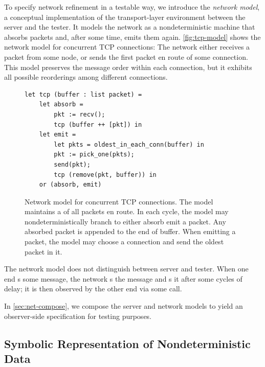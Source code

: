To specify network refinement in a testable way, we introduce
the {\em network model}, a conceptual implementation of the transport-layer
environment between the server and the tester.  It models the network as a
nondeterministic machine that absorbs packets and,  after some time, emits
them again.  \autoref{fig:tcp-model} shows the network model for concurrent TCP
connections: The network
either
receives a packet from some node, or sends the first packet en route of some
connection.  This model preserves the message order within each connection,
but it exhibits all possible reorderings among different connections.

\begin{figure}
\begin{lstlisting}[style=customcoq]
let tcp (buffer : list packet) =
    let absorb =
        pkt := recv();
        tcp (buffer ++ [pkt]) in
    let emit =
        let pkts = oldest_in_each_conn(buffer) in
        pkt := pick_one(pkts);
        send(pkt);
        tcp (remove(pkt, buffer)) in
    or (absorb, emit)
\end{lstlisting}
\caption{Network model for concurrent TCP connections.  The model maintains a
   of all packets en
  route.  In each cycle, the model may nondeterministically branch to either
  absorb  emit a packet.  Any absorbed packet is appended to the end of
  buffer.  When emitting a packet, the model may choose a connection and send
  the oldest packet in it.
}
\label{fig:tcp-model}
\end{figure}

The network model does not distinguish between server and tester.  When one end
s some message, the network s the message and s it
after some cycles of delay; it is then observed by the other end via some
 call.

In \autoref{sec:net-compose}, we compose the server and network models to yield an
observer-side specification for testing purposes.

\subsection{Symbolic Representation of Nondeterministic Data}
\label{sec:symbolic-model}

